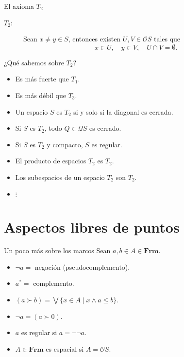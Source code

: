 \documentclass[compress,12pt]{beamer}
\begin{document}
\begin{frame}{El axioma $T_2$}
    \begin{description}
        \item[$T_2$:] Sean $x\neq y\in S$, entonces existen $U, V\in \mathcal{O}S$ tales que
        \[
        x\in U,\quad y\in V, \quad U\cap V=\emptyset.
        \]
    \end{description}
\end{frame}

\begin{frame}{¿Qué sabemos sobre $T_2$?}
    \begin{itemize}
        \item Es más fuerte que $T_1$.
        \item<2-> Es más débil que $T_3$.
        \item<3-> Un espacio $S$ es $T_2$ si y solo si la diagonal es cerrada.
        \item<4-> Si $S$ es $T_2$, todo $Q\in \mathcal{Q}S$ es cerrado.
        \item<5-> Si $S$ es $T_2$ y compacto, $S$ es regular.
        \item<6-> El producto de espacios $T_2$ es $T_2$.
        \item<7-> Los subespacios de un espacio $T_2$ son $T_2$.
        \item<8-> $\vdots$
    \end{itemize}
\end{frame}

\section{Aspectos libres de puntos}

\begin{frame}{Un poco más sobre los marcos}
    Sean $a, b\in A\in \mathbf{Frm}$.
    \begin{itemize}
        \item<2-> $\neg a=$ negación (pseudocomplemento).
        \item<3-> $a^*=$ complemento.
        \item<4-> $(a\succ b)=\bigvee\{x\in A\mid x\wedge a\leq b\}$.
        \item<5-> $\neg a=(a\succ 0)$.
        \item<6-> $a$ es regular si $a=\neg\neg a$.
        \item<7-> $A\in \mathbf{Frm}$ es espacial si $A=\mathcal{O}S$.
    \end{itemize}
\end{frame}
\end{document}
